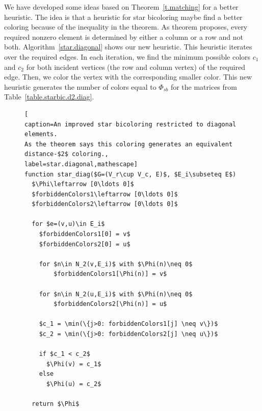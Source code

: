 \documentclass[12pt, twoside,a4paper,toc=bibliography]{scrbook}
\newcommand{\coderef}[1]{Algorithm~\protect\ref{#1}}
\begin{document}
We have developed some ideas based on Theorem~\ref{t.matching}
for a better heuristic. The idea is that a heuristic for star bicoloring maybe
find a better coloring because of the inequality in the theorem.
As theorem proposes, every required nonzero element
is determined by either a column or a row and not both.
\coderef{star.diagonal} shows our new heuristic. This heuristic
iterates over the required edges.
In each iteration, we find the minimum possible colors $c_1$ and $c_2$
for both incident vertices (the row and column vertex) of the required edge.
Then, we color the vertex with the corresponding smaller color.
This new heuristic generates the number of colors equal to $\Phi_{sb}$
for the matrices from Table~\ref{table.starbic.d2.diag}.


\begin{figure}
\begin{lstlisting}[
caption=An improved star bicoloring restricted to diagonal elements.
As the theorem says this coloring generates an equivalent distance-$2$ coloring.,
label=star.diagonal,mathescape]
function star_diag($G=(V_r\cup V_c, E)$, $E_i\subseteq E$)
  $\Phi\leftarrow [0\ldots 0]$
  $forbiddenColors1\leftarrow [0\ldots 0]$
  $forbiddenColors2\leftarrow [0\ldots 0]$

  for $e=(v,u)\in E_i$
    $forbiddenColors1[0] = v$
    $forbiddenColors2[0] = u$

    for $n\in N_2(v,E_i)$ with $\Phi(n)\neq 0$
        $forbiddenColors1[\Phi(n)] = v$

    for $n\in N_2(u,E_i)$ with $\Phi(n)\neq 0$
        $forbiddenColors2[\Phi(n)] = u$

    $c_1 = \min(\{j>0: forbiddenColors1[j] \neq v\})$
    $c_2 = \min(\{j>0: forbiddenColors2[j] \neq u\})$

    if $c_1 < c_2$
      $\Phi(v) = c_1$
    else
      $\Phi(u) = c_2$

  return $\Phi$
\end{lstlisting}
\end{figure}


\clearpage
\end{document}
